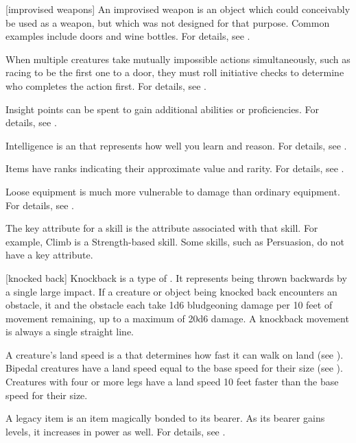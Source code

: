 [improvised weapons] An improvised weapon is an object which could conceivably be used as a weapon, but which was not designed for that purpose.
Common examples include doors and wine bottles.
For details, see .

 When multiple creatures take mutually impossible actions simultaneously, such as racing to be the first one to a door, they must roll initiative checks to determine who completes the action first.
For details, see .

 Insight points can be spent to gain additional abilities or proficiencies.
For details, see .

 Intelligence is an  that represents how well you learn and reason.
For details, see .

 Items have ranks indicating their approximate value and rarity.
For details, see .

 Loose equipment is much more vulnerable to damage than ordinary equipment.
For details, see .

 The key attribute for a skill is the attribute associated with that skill.
For example, Climb is a Strength-based skill.
Some skills, such as Persuasion, do not have a key attribute.

[knocked back] Knockback is a type of .
It represents being thrown backwards by a single large impact.
If a creature or object being knocked back encounters an obstacle, it and the obstacle each take 1d6 bludgeoning damage per 10 feet of movement remaining, up to a maximum of 20d6 damage.
A knockback movement is always a single straight line.

 A creature's land speed is a  that determines how fast it can walk on land (see ).
Bipedal creatures have a land speed equal to the base speed for their size (see ).
Creatures with four or more legs have a land speed 10 feet faster than the base speed for their size.

 A legacy item is an item magically bonded to its bearer.
As its bearer gains levels, it increases in power as well.
For details, see .

